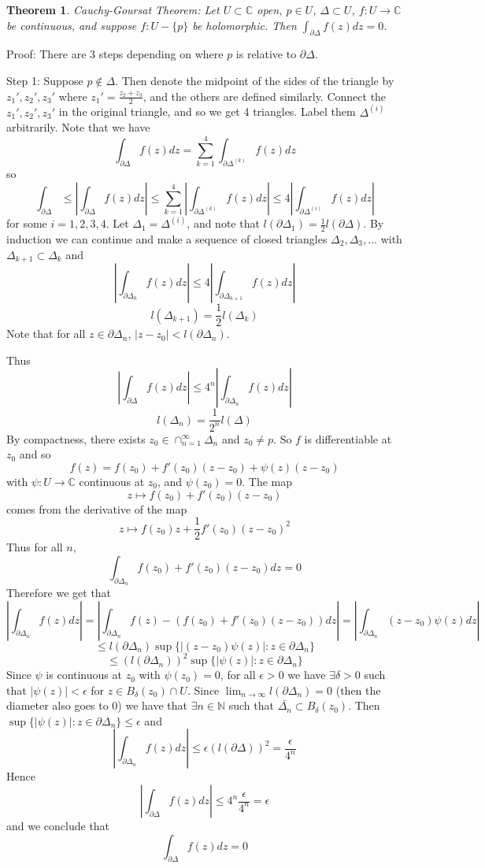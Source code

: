 \documentclass[11pt]{article}
\theoremstyle{plain}
\newtheorem{theorem}{Theorem}[section]
\theoremstyle{definition}
\newcommand{\C}{\mathbb{C}}
\begin{document}
\begin{theorem}
Cauchy-Goursat Theorem: Let $U \subset \C$ open, $p \in U$, $\Delta \subset U$, $f: U \to \C$ be continuous, and suppose $f: U - \{p\}$ be holomorphic. Then $\int_{\partial\Delta}f(z)dz = 0$.
\end{theorem}

Proof: There are 3 steps depending on where $p$ is relative to $\partial\Delta$.

Step 1: Suppose $p \notin \Delta$. Then denote the midpoint of the sides of the triangle by $z_1', z_2', z_3'$ where $z_1' = \frac{z_2 + z_3}{2}$, and the others are defined similarly. Connect the $z_1', z_2', z_3'$ in the original triangle, and so we get 4 triangles. Label them $\Delta^(i)$ arbitrarily. Note that we have 
$$ \int_{\partial\Delta} f(z)dz = \sum_{k=1}^4 \int_{\partial\Delta^(k)} f(z)dz $$
so 
$$ \int_{\partial\Delta} \leq \left|\int_{\partial\Delta} f(z)dz\right| \leq \sum_{k = 1}^4 \left|\int_{\partial\Delta^{(k)}} f(z)dz\right| \leq 4\left| \int_{\partial\Delta^{(i)}} f(z)dz \right|$$
for some $i = 1, 2, 3, 4$. Let $\Delta_1 = \Delta^{(i)}$, and note that $l(\partial\Delta_1) = \frac{1}{2}l(\partial\Delta)$. By induction we can continue and make a sequence of closed triangles $\Delta_2, \Delta_3, ...$ with $\Delta_{k+1} \subset \Delta_{k}$ and 
$$ \left|\int_{\partial\Delta_k} f(z)dz \right| \leq 4\left|\int_{\partial\Delta_{k+1}} f(z)dz\right| $$
$$l(\Delta_{k+1}) = \frac{1}{2} l(\Delta_{k})$$
Note that for all $z \in \partial\Delta_n$, $|z - z_0| < l(\partial\Delta_n)$.

Thus
$$ \left|\int_{\partial\Delta} f(z)dz \right| \leq 4^n\left|\int_{\partial\Delta_{n}} f(z)dz\right| $$
$$l(\Delta_{n}) = \frac{1}{2^n} l(\Delta)$$
By compactness, there exists $z_0 \in \cap_{n=1}^{\infty}\Delta_n$ and $z_0 \neq p$. So $f$ is differentiable at $z_0$ and so 
$$ f(z) = f(z_0) + f'(z_0)(z - z_0) + \psi(z)(z - z_0) $$
with $\psi:U\to\C$ continuous at $z_0$, and $\psi(z_0) = 0$. The map 
$$ z \mapsto f(z_0) + f'(z_0)( z - z_0) $$
comes from the derivative of the map 
$$ z \mapsto f(z_0)z + \frac{1}{2}f'(z_0)(z - z_0)^2 $$
Thus for all $n$,
$$ \int_{\partial\Delta_n}f(z_0) + f'(z_0)(z - z_0)dz = 0 $$
Therefore we get that 
$$ \left| \int_{\partial\Delta_n} f(z)dz \right| = \left| \int_{\partial\Delta_n} f(z) - (f(z_0) + f'(z_0)(z - z_0))dz \right| = \left| \int_{\partial\Delta_n}(z - z_0)\psi(z)dz \right| $$
$$ \leq l(\partial\Delta_n)\sup\{|(z - z_0)\psi(z)| : z \in\partial\Delta_n\} $$
$$ \leq (l(\partial\Delta_n))^2\sup\{|\psi(z)|:z \in \partial\Delta_n\} $$
Since $\psi$ is continuous at $z_0$ with $\psi(z_0) = 0$, for all $\epsilon > 0$ we have $\exists \delta > 0$ such that $|\psi(z)| < \epsilon$ for $z \in B_{\delta}(z_0) \cap U$. Since $\lim_{n \to \infty}l(\partial\Delta_n) = 0$ (then the diameter also goes to 0) we have that $\exists n \in \mathbb{N}$ such that $\bar{\Delta_n} \subset B_{\delta}(z_0)$. Then $\sup\{ |\psi(z)|: z \in \partial\Delta_n\} \leq \epsilon$ and 
$$ \left| \int_{\partial\Delta_n} f(z)dz \right| \leq \epsilon(l(\partial\Delta))^2 = \frac{\epsilon}{4^n}$$
Hence 
$$ \left|\int_{\partial\Delta}f(z)dz \right| \leq 4^n \frac{\epsilon}{4^n} = \epsilon $$
and we conclude that 
$$ \int_{\partial\Delta}f(z)dz = 0 $$
\end{document}
